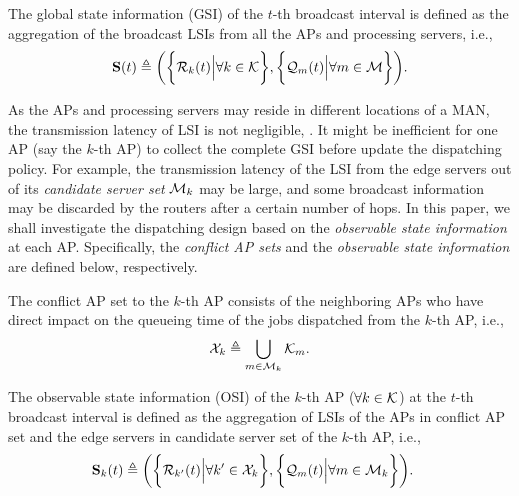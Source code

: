 \begin{definition}
    The global state information (GSI) of the $t$-th broadcast interval is defined as the aggregation of the broadcast LSIs from all the APs and processing servers, i.e.,
    {\small
    \begin{align}
        \mathbf{S}(t) \triangleq
            \bigg(
                \bigg\{\mathcal{R}_{k}(t) \Big| \forall k\in\mathcal{K}\bigg\},
                \bigg\{\mathcal{Q}_{m}(t) \Big| \forall m\in\mathcal{M}\bigg\}
            \bigg).
    \end{align}
    }%
\end{definition}

As the APs and processing servers may reside in different locations of a MAN, the transmission latency of LSI is not negligible, .
It might be inefficient for one AP (say the $k$-th AP) to collect the complete GSI before update the dispatching policy.
For example, the transmission latency of the LSI from the edge servers out of its \emph{candidate server set} $\mathcal{M}_{k}$ may be large, and some broadcast information may be discarded by the routers after a certain number of hops.
In this paper, we shall investigate the dispatching design based on the \emph{observable state information} at each AP.
Specifically, the \emph{conflict AP sets} and the \emph{observable state information} are defined below, respectively.
\begin{definition}
    The conflict AP set to the $k$-th AP consists of the neighboring APs who have direct impact on the queueing time of the jobs dispatched from the $k$-th AP, i.e.,
    {\small
    \begin{align}
        \mathcal{X}_{k} \triangleq \bigcup_{m\in\mathcal{M}_{k}} \mathcal{K}_{m}.
    \end{align}
    }%
\end{definition}

\begin{definition}
    The observable state information (OSI) of the $k$-th AP ($\forall k\in\mathcal{K}$) at the $t$-th broadcast interval is defined as the aggregation of LSIs of the APs in {conflict AP set} and the edge servers in {candidate server set} of the $k$-th AP, i.e.,
    {\small
    \begin{align}
        \mathbf{S}_{k}(t) &\triangleq
        \bigg(
            \bigg\{\mathcal{R}_{k'}(t) \Big| \forall k'\in\mathcal{X}_{k}\bigg\},
            \bigg\{\mathcal{Q}_{m}(t) \Big| \forall m\in\mathcal{M}_{k}\bigg\}
        \bigg).
    \end{align}
    }%
    \label{def:OSI}
\end{definition}

